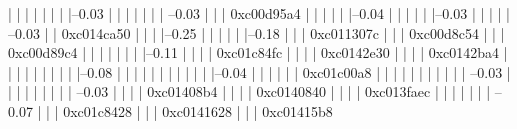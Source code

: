            |          |          |          |          
            |          |          |          |--0.03%
            |          |          |          |          
            |          |          |           --0.03%
            |          |          |                     0xc00d95a4
            |          |          |          
            |          |          |--0.04%
            |          |          |          
            |          |          |--0.03%
            |          |          |          
            |          |           --0.03%
            |          |                     0xc014ca50
            |          |          
            |          |--0.25%
            |          |          |          
            |          |          |--0.18%
            |          |          |          0xc011307c
            |          |          |          0xc00d8c54
            |          |          |          0xc00d89c4
            |          |          |          |          
            |          |          |          |--0.11%
            |          |          |          |          0xc01c84fc
            |          |          |          |          0xc0142e30
            |          |          |          |          0xc0142ba4
            |          |          |          |          |          
            |          |          |          |          |--0.08%
            |          |          |          |          |          |          
            |          |          |          |          |          |--0.04%
            |          |          |          |          |          |          0xc01c00a8
            |          |          |          |          |          |          
            |          |          |          |          |           --0.03%
            |          |          |          |          |          
            |          |          |          |           --0.03%
            |          |          |          |                     0xc01408b4
            |          |          |          |                     0xc0140840
            |          |          |          |                     0xc013faec
            |          |          |          |          
            |          |          |           --0.07%
            |          |          |                     0xc01c8428
            |          |          |                     0xc0141628
            |          |          |                     0xc01415b8

